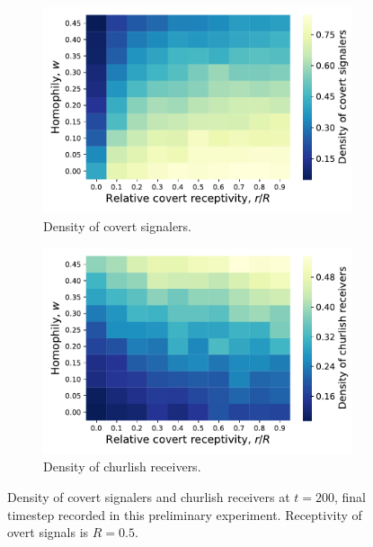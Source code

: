 \documentclass[11pt,letterpaper]{article}
\begin{document}
\begin{figure}[H]
  \centering
  \begin{subfigure}{0.49\textwidth}
    \centering
    \includegraphics[width=\textwidth]{prelim/Figures/covertDensityVsReceptivityHomophilyCoevo.pdf}
    \caption{Density of covert signalers.}
  \end{subfigure}
  \begin{subfigure}{0.49\textwidth}
    \centering
    \includegraphics[width=\textwidth]{prelim/Figures/churlishDensityVsReceptivityHomophilyCoevo.pdf}
    \caption{Density of churlish receivers.}
  \end{subfigure}
  
  \caption{Density of covert signalers and churlish receivers at $t=200$, 
    final timestep recorded in this preliminary experiment. Receptivity of
    overt signals is $R=0.5$.}
  \label{fig:dislikingHomophilyHeatmap}
\end{figure}
\end{document}
